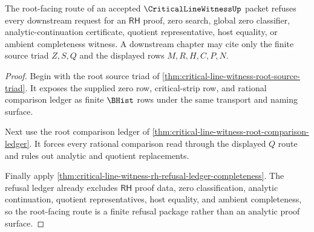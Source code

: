 \begin{theorem}
\label{thm:critical-line-witness-root-refusal-route}
The root-facing route of an accepted $\CriticalLineWitnessUp$ packet refuses every downstream request for an $\mathsf{RH}$ proof, zero search, global zero classifier, analytic-continuation certificate, quotient representative, host equality, or ambient completeness witness. A downstream chapter may cite only the finite source triad $Z,S,Q$ and the displayed rows $M,R,H,C,P,N$.
\end{theorem}
\begin{proof}
Begin with the root source triad of \autoref{thm:critical-line-witness-root-source-triad}. It exposes the supplied zero row, critical-strip row, and rational comparison ledger as finite $\BHist$ rows under the same transport and naming surface.

Next use the root comparison ledger of \autoref{thm:critical-line-witness-root-comparison-ledger}. It forces every rational comparison read through the displayed $Q$ route and rules out analytic and quotient replacements.

Finally apply \autoref{thm:critical-line-witness-rh-refusal-ledger-completeness}. The refusal ledger already excludes $\mathsf{RH}$ proof data, zero classification, analytic continuation, quotient representatives, host equality, and ambient completeness, so the root-facing route is a finite refusal package rather than an analytic proof surface.
\end{proof}
